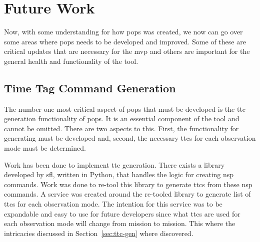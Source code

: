 


\section{Future Work}

Now, with some understanding for how \gls{pops} was created, we now can go over
some areas where \gls{pops} needs to be developed and improved. Some of these
are critical updates that are necessary for the \gls{mvp} and others are
important for the general health and functionality of the tool.

\subsection{Time Tag Command Generation}

The number one most critical aspect of \gls{pops} that must be developed is the
\gls{ttc} generation functionality of \gls{pops}. It is an essential component
of the tool and cannot be omitted. There are two aspects to this. First, the
functionality for generating  must be developed and, second, the
necessary \glspl{ttc} for each observation mode must be determined.

Work has been done to implement \gls{ttc} generation. There exists a library
developed by \gls{sfl}, written in Python, that handles the logic for creating
\gls{nsp} commands. Work was done to re-tool this library to generate
\glspl{ttc} from these \gls{nsp} commands. A service was created around the
re-tooled library to generate list of \glspl{ttc} for each observation mode.
The intention for this service was to be expandable and easy to use for future
developers since what \glspl{ttc} are used for each observation mode will
change from mission to mission. This where the intricacies discussed in
Section~\ref{sec:ttc-gen} where discovered.  

